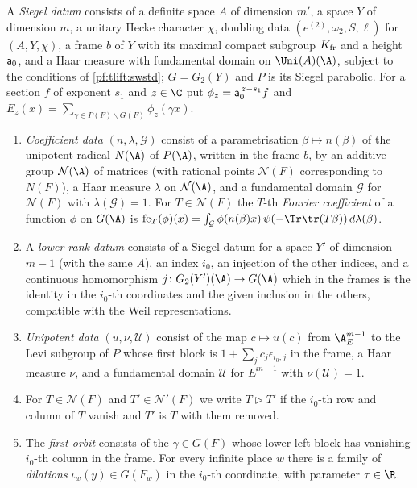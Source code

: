 \begin{definition}\label{pf:tlift:sdata}
A \emph{Siegel datum} consists of a definite space $A$ of dimension $m'$, a space $Y$ of dimension $m$, a unitary Hecke
character $\chi$, doubling data $(e^{(2)},\omega_2,S,\ell)$ for $(A,Y,\chi)$, a frame $b$ of $Y$ with its maximal compact
subgroup $K_{\mathrm{fr}}$ and a height $\mathsf{a}_0$, and a Haar measure with fundamental domain on $\Uni(A)(\A)$, subject to the
conditions of \cref{pf:tlift:swstd}; $G=G_2(Y)$ and $P$ is its Siegel parabolic. For a section $f$ of exponent $s_1$
and $z\in\C$ put $\phi_z=\mathsf{a}_0^{\,z-s_1}f$ and $E_z(x)=\sum_{\gamma\in P(F)\backslash G(F)}\phi_z(\gamma x)$.
\begin{enumerate}[label=(\alph*),nosep]
\item \emph{Coefficient data} $(n,\lambda,\mathcal G)$ consist of a parametrisation $\beta\mapsto n(\beta)$ of the unipotent
  radical $N(\A)$ of $P(\A)$, written in the frame $b$, by an additive group $\mathcal N(\A)$ of matrices (with rational points
  $\mathcal N(F)$ corresponding to $N(F)$), a Haar measure $\lambda$ on $\mathcal N(\A)$, and a fundamental domain $\mathcal G$ for $\mathcal N(F)$ with
  $\lambda(\mathcal G)=1$. For $T\in\mathcal N(F)$ the $T$-th \emph{Fourier coefficient} of a function $\phi$ on
  $G(\A)$ is $\mathrm{fc}_T(\phi)(x)=\int_{\mathcal G}\phi(n(\beta)x)\,\psi(-\Tr\tr(T\beta))\,d\lambda(\beta)$.
\item A \emph{lower-rank datum} consists of a Siegel datum for a space $Y'$ of dimension $m-1$ (with the same $A$), an
  index $i_0$, an injection of the other indices, and a continuous homomorphism $j\colon G_2(Y')(\A)\to G(\A)$ which in
  the frames is the identity in the $i_0$-th coordinates and the given inclusion in the others, compatible with
  the Weil representations.
\item \emph{Unipotent data} $(u,\nu,\mathcal U)$ consist of the map $c\mapsto u(c)$ from $\tliftAE^{m-1}$ to the Levi subgroup of $P$
  whose first block is $1+\sum_jc_j\epsilon_{i_0,j}$ in the frame, a Haar measure $\nu$, and a fundamental domain $\mathcal U$ for
  $E^{m-1}$ with $\nu(\mathcal U)=1$.
\item For $T\in\mathcal N(F)$ and $T'\in\mathcal N'(F)$ we write $T\rhd T'$ if the $i_0$-th row and column of $T$ vanish and
  $T'$ is $T$ with them removed.
\item The \emph{first orbit} consists of the $\gamma\in G(F)$ whose lower left block has vanishing $i_0$-th column in the
  frame. For every infinite place $w$ there is a family of \emph{dilations} $\iota_w(y)\in G(F_w)$ in the $i_0$-th
  coordinate, with parameter $\tau\in\R$.
\end{enumerate}
\end{definition}

